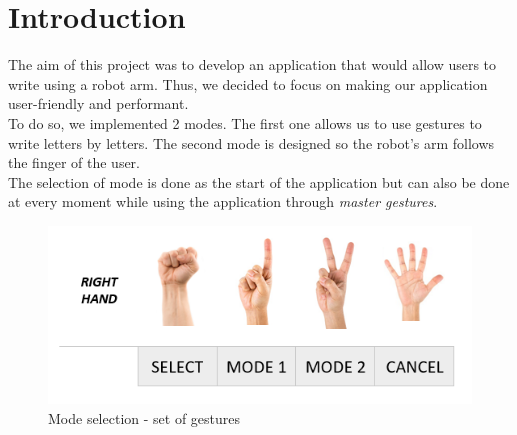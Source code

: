 \section{Introduction}

The aim of this project was to develop an application that would allow users to write using a robot arm. Thus, we decided to focus on making our application user-friendly and performant.\\
To do so, we implemented 2 modes. The first one allows us to use gestures to write letters by letters. The second mode is designed so the robot's arm follows the finger of the user. \\

The selection of mode is done as the start of the application but can also be done at every moment while using the application through \textit{master gestures}.

\begin{figure}[H]
	\includegraphics{mode_selection}
	\centering
	\caption{Mode selection - set of gestures}
	\label{fig:mode}
\end{figure}
